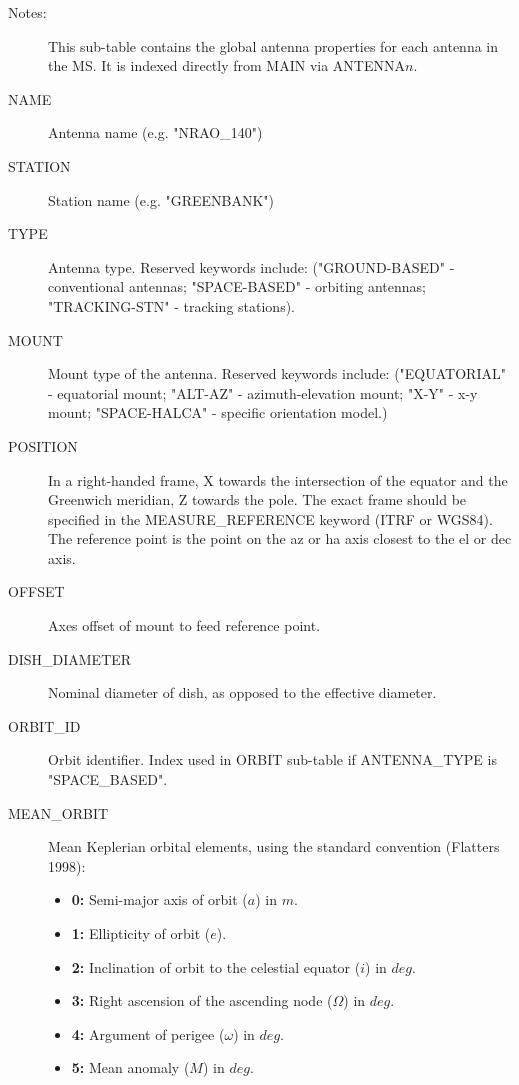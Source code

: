 \documentclass{article}
\begin{document}
\begin{itemize}
\begin{description}
\item[Notes:] This sub-table contains the global antenna properties
for each antenna in the MS. It is indexed directly from MAIN via
ANTENNA$n$.

\item[NAME] Antenna name (e.g. "NRAO\_140")

\item[STATION] Station name (e.g. "GREENBANK")

\item[TYPE] Antenna type. Reserved keywords include:
("GROUND-BASED" - conventional antennas; "SPACE-BASED" - orbiting
antennas; "TRACKING-STN" - tracking stations).

\item[MOUNT] Mount type of the antenna. Reserved keywords include:
("EQUATORIAL" - equatorial mount; "ALT-AZ" - azimuth-elevation mount; "X-Y"
- x-y mount; "SPACE-HALCA" - specific orientation model.)

\item[POSITION] In a right-handed frame, X towards the intersection of
the equator and the Greenwich meridian, Z towards the pole. The exact
frame should be specified in the MEASURE\_REFERENCE keyword (ITRF or
WGS84). The reference point is the point on the az or ha axis closest
to the el or dec axis.

\item[OFFSET] Axes offset of mount to feed reference point.

\item[DISH\_DIAMETER] Nominal diameter of dish, as opposed to the
effective diameter.

\item[ORBIT\_ID] Orbit identifier. Index used in ORBIT sub-table if
ANTENNA\_TYPE is "SPACE\_BASED".

\item[MEAN\_ORBIT] Mean Keplerian orbital elements, using the
standard convention (Flatters 1998): 
\begin{itemize}
   \item{{\bf 0:} Semi-major axis of orbit ($a$) in $m$.}
   \item{{\bf 1:} Ellipticity of orbit ($e$).}
   \item{{\bf 2:} Inclination of orbit to the celestial equator ($i$) 
                  in $deg.$}
   \item{{\bf 3:} Right ascension of the ascending node ($\Omega$) in $deg.$}
   \item{{\bf 4:} Argument of perigee ($\omega$) in $deg.$}
   \item{{\bf 5:} Mean anomaly ($M$) in $deg.$}
\end{itemize}


\end{description}
\end{itemize}
\end{document}
